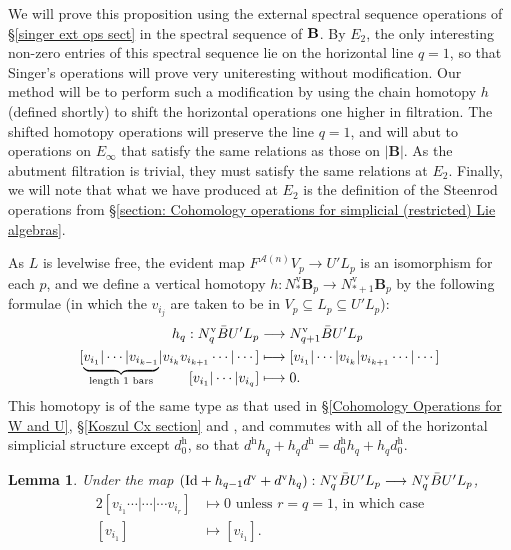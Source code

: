 \documentclass[11pt]{amsart} \renewcommand{\baselinestretch}{1.2}
\theoremstyle{plain}
\newtheorem{lem}[thm]{Lemma}
\numberwithin{equation}{section} %
\theoremstyle{plain}
\newtheorem{lem}[thm]{Lemma}
\numberwithin{equation}{chapter} %
\renewcommand{\to}{\longrightarrow}
\newcommand{\calA}{\mathcal{A}}
\newcommand{\UEA}{U'}%
\newcommand{\uver}{^\mathrm{v}}
\newcommand{\uhor}{^\mathrm{h}}
\newcommand{\diag}[1]{|#1|}
\begin{document}
\begin{appendices}
We will prove this proposition using the external spectral sequence operations of \S\ref{singer ext ops sect} in the spectral sequence of $\textup{\textbf{B}}$. By $E_2$, the only interesting non-zero entries of this spectral sequence lie on the horizontal line $q=1$, so that Singer's operations will prove very uniteresting without modification. Our method will be to perform such a modification by using the  chain homotopy $h$ (defined shortly) to shift the horizontal operations one higher in filtration. The shifted homotopy operations will preserve the line $q=1$, and will abut to operations on $E_\infty$ that satisfy the same relations as those on $\diag{\textbf{B}}$. As the abutment filtration is trivial, they must satisfy the same relations at $E_2$. Finally, we will note that what we have produced at $E_2$ is the definition of the Steenrod operations from \S\ref{section: Cohomology operations for simplicial (restricted) Lie algebras}.


As $ L$ is levelwise free, the evident map $F^{\calA(n)}V_p\to \UEA L_p$ is an isomorphism for each $p$, and we define a vertical homotopy $h:N\uver_*\textbf{B}_{p}\to N\uver_{*+1}\textbf{B}_{p}$ by the following formulae (in which the $v_{i_{j}}$ are taken to be in $V_p\subseteq  L_p\subseteq\UEA L_p$):
\begin{alignat*}{2}
h_q:N\uver_q\bar{B}\UEA L_p&\overset{}{\longrightarrow} N\uver_{q+1}\bar{B}\UEA L_p\\
[\smash{\underbrace{v_{i_1}|\cdots |v_{i_{k-1}}}_{\textup{length 1 bars}}}|v_{i_{k}}v_{i_{k+1}}\cdots |\cdots ]
&\overset{}{\longmapsto}
[v_{i_1}|\cdots |v_{i_{k}}|v_{i_{k+1}}\cdots |\cdots ]%
\\
[v_{i_1}|\cdots |v_{i_{q}}]
&\overset{}{\longmapsto}0.
\end{alignat*}
This homotopy is of the same type as that used in \S\ref{Cohomology Operations for W and U}, \S\ref{Koszul Cx section} and \cite[Proof of Theorem 5.3]{PriddyKoszul.pdf}, and commutes with all of the horizontal simplicial structure except $d\uhor_0$, so that $d\uhor h_q+h_qd\uhor =d\uhor_0h_q+h_qd\uhor_0$.
\begin{lem}
\label{barConstNullHtpyLemma}
Under the map $(\textup{Id}+h_{q-1}d\uver+d\uver h_{q}): N\uver_q\bar{B}\UEA L_p\to N\uver_q\bar{B}\UEA L_p$,
\begin{alignat*}{2}
[v_{i_1}\cdots |\cdots |\cdots v_{i_r}]
&\longmapsto0\text{ unless $r=q=1$, in which case}%
\\
[v_{i_1}]
&\longmapsto [v_{i_{1}}].
\end{alignat*}
\end{lem}


\end{appendices}
\end{document}
